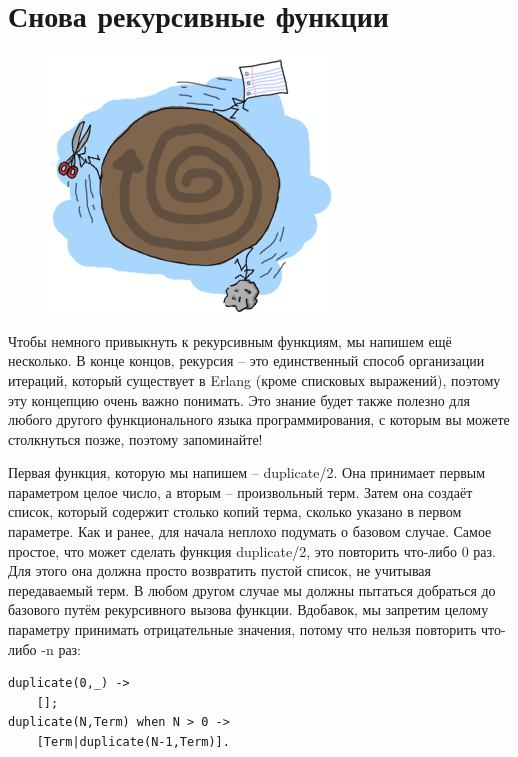 \documentclass[a4paper,12pt]{report}
\newcommand{\ops}{\colorbox{lgreen}}
\begin{document}
\section{Снова рекурсивные функции}
\begin{figure}
    \includegraphics[width=1\linewidth]{rock-paper-scissors.png}
\end{figure}
Чтобы немного привыкнуть к рекурсивным функциям, мы напишем ещё несколько. В конце концов, рекурсия \--- это единственный способ организации итераций, который существует в Erlang (кроме списковых выражений), поэтому эту концепцию очень важно понимать. Это знание будет также полезно для любого другого функционального языка программирования, с которым вы можете столкнуться позже, поэтому запоминайте!

Первая функция, которую мы напишем \--- \ops{duplicate/2}. Она принимает первым параметром целое число, а вторым \--- произвольный терм. Затем она создаёт список, который содержит столько копий терма, сколько указано в первом параметре. Как и ранее, для начала неплохо подумать о базовом случае. Самое простое, что может сделать функция \ops{duplicate/2}, это повторить что\--либо 0 раз. Для этого она должна просто возвратить пустой список, не учитывая передаваемый терм. В любом другом случае мы должны пытаться добраться до базового путём рекурсивного вызова функции. Вдобавок, мы запретим целому параметру принимать отрицательные значения, потому что нельзя повторить что\--либо \ops{-n} раз:
\begin{lstlisting}[style=erlang]
duplicate(0,_) ->
    [];
duplicate(N,Term) when N > 0 ->
    [Term|duplicate(N-1,Term)].
\end{lstlisting}
\end{document}
